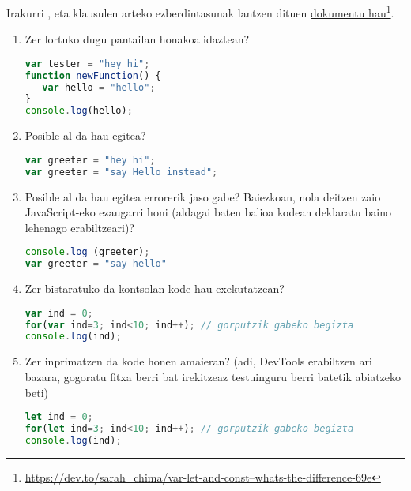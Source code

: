  Irakurri ,  eta  klausulen arteko ezberdintasunak lantzen dituen \href{https://dev.to/sarah\_chima/var-let-and-const--whats-the-difference-69e}{dokumentu hau}\footnote{
 \href{ https://dev.to/sarah\_chima/var-let-and-const--whats-the-difference-69e}{https://dev.to/sarah\_chima/var-let-and-const--whats-the-difference-69e}}.
    
   
\begin{enumerate}
    \item Zer lortuko dugu pantailan honakoa idaztean?    
\begin{lstlisting}[language=JavaScript,numbers=none]
var tester = "hey hi";
function newFunction() {
   var hello = "hello";
}
console.log(hello);

\end{lstlisting}

\item Posible al da hau egitea?
\begin{lstlisting}[language=JavaScript,numbers=none]
var greeter = "hey hi";
var greeter = "say Hello instead";   
    \end{lstlisting}

\item  Posible al da hau egitea errorerik jaso gabe? Baiezkoan, nola deitzen zaio JavaScript-eko
ezaugarri honi (aldagai baten balioa kodean deklaratu baino lehenago erabiltzeari)?
\begin{lstlisting}[language=JavaScript,numbers=none]
console.log (greeter);
var greeter = "say hello"    
    \end{lstlisting}

\item  Zer bistaratuko da kontsolan kode hau exekutatzean?
\begin{lstlisting}[language=JavaScript,numbers=none]
var ind = 0;
for(var ind=3; ind<10; ind++); // gorputzik gabeko begizta
console.log(ind);

\end{lstlisting}

\item Zer inprimatzen da kode honen amaieran?
(adi, DevTools erabiltzen ari bazara, gogoratu fitxa berri bat irekitzeaz testuinguru berri batetik
abiatzeko beti)

\begin{lstlisting}[language=JavaScript,numbers=none]
let ind = 0;
for(let ind=3; ind<10; ind++); // gorputzik gabeko begizta
console.log(ind);
\end{lstlisting}


\end{enumerate}
